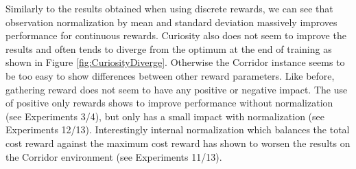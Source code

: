 Similarly to the results obtained when using discrete rewards, we can see that observation normalization by mean and standard deviation massively improves performance for continuous rewards. Curiosity also does not seem to improve the results and often tends to diverge from the optimum at the end of training as shown in Figure \ref{fig:CuriosityDiverge}. Otherwise the Corridor instance seems to be too easy to show differences between other reward parameters. Like before, gathering reward does not seem to have any positive or negative impact. The use of positive only rewards shows to improve performance without normalization (see Experiments 3/4), but only has a small impact with normalization (see Experiments 12/13). Interestingly internal normalization which balances the total cost reward against the maximum cost reward has shown to worsen the results on the Corridor environment (see Experiments 11/13). 

